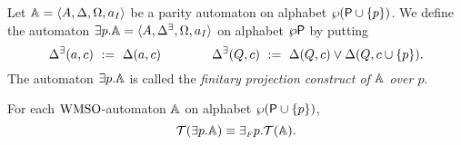
\begin{definition}\label{DEF_fin_projection}
Let $\mathbb{A} = \langle{A, \Delta, \Omega, a_I}\rangle$ be a parity automaton on alphabet $\wp(\mathsf{P} \cup \{p\})$. We define the automaton ${{\exists} p}.\mathbb{A} = \langle{A, \Delta^\exists, \Omega, a_I}\rangle$ on alphabet $\wp\mathsf{P}$ by putting
\begin{equation*}
  \Delta^\exists(a,c) \ \mathrel{: =} \ \Delta(a,c) \qquad \qquad
  \Delta^\exists(Q,c) \ \mathrel{: =} \ \Delta(Q,c) \vee \Delta(Q,c\cup\{p\}).
\end{equation*}
The automaton ${{\exists} p}.\mathbb{A}$ is called the \emph{finitary projection
construct of $\mathbb{A}$ over $p$}.
\end{definition}


\begin{lemma}\label{PROP_fin_projection} 
For each $\mathrm{WMSO}$-automaton $\mathbb{A}$ on alphabet $\wp (\mathsf{P} \cup \{p\})$, 
$$\mathcal{T}({{\exists} p}.\mathbb{A}) \equiv
{{\exists_{{\scriptscriptstyle F}}} p}.\mathcal{T}(\mathbb{A}).$$
\end{lemma}

